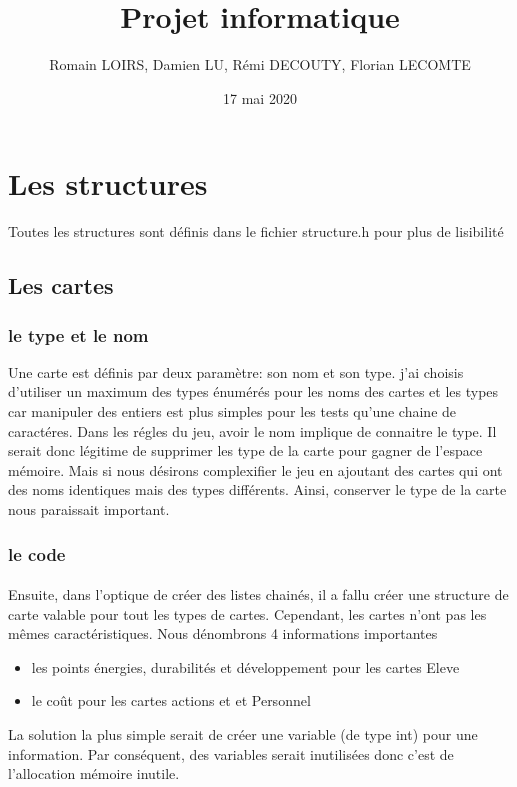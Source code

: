 \documentclass[12pt]{article}
\title{Projet informatique}
\author{Romain LOIRS, Damien LU, Rémi DECOUTY, Florian LECOMTE}
\date{17 mai 2020}
\begin{document}
\maketitle

\tableofcontents

\newpage

\section{Les structures}

Toutes les structures sont définis dans le fichier structure.h pour plus de lisibilit\'e

\subsection{Les cartes}

\subsubsection{le type et le nom}

 Une carte est définis par deux paramètre: son nom et son type. j'ai choisis d'utiliser un maximum des types \'enum\'er\'es pour les noms des cartes et les types car manipuler des entiers est plus simples pour les tests qu'une chaine de caract\'eres. Dans les régles du jeu, avoir le nom implique de connaitre le type. Il serait donc légitime de supprimer les type de la carte pour gagner de l'espace mémoire. Mais si nous désirons complexifier le jeu en ajoutant des cartes qui ont des noms identiques mais des types différents. Ainsi, conserver le type de la carte nous paraissait important.
 
\subsubsection{le code}

\paragraph{}
 Ensuite, dans l'optique de créer des listes chainés, il a fallu créer une structure de carte valable pour tout les types de cartes. Cependant, les cartes n'ont pas les mêmes caractéristiques. Nous dénombrons 4 informations importantes 
 \begin{itemize}
 	\item les points énergies, durabilités et développement pour les cartes Eleve
 	\item le coût pour les cartes actions et et Personnel
 \end{itemize}
 La solution la plus simple serait de créer une  variable (de type int) pour une information. Par conséquent, des variables serait inutilisées donc c'est de l'allocation mémoire inutile.
 
\end{document}
